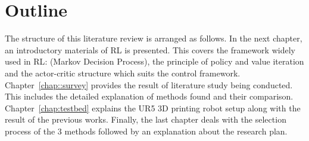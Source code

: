 \section{Outline}

The structure of this literature review is arranged as follows. In the next chapter, an introductory materials of \ac{RL} is presented. This covers the framework widely used in \ac{RL}: (Markov Decision Process), the principle of policy and value iteration and the actor-critic structure which suits the control framework. Chapter~\ref{chap::survey} provides the result of literature study being conducted. This includes the detailed explanation of methods found and their comparison. Chapter~\ref{chap:testbed} explains the UR5 3D printing robot setup along with the result of the previous works. Finally, the last chapter deals with the selection process of the 3 methods followed by an explanation about the research plan.  



